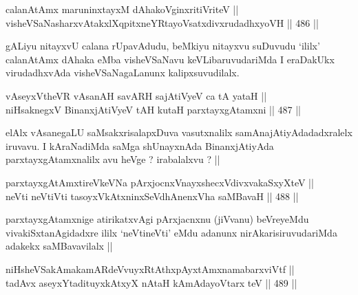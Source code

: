 
\begin{shl}
calanAtAmx maruninxtayxM dAhakoV\s ginxritiVriteV || \\
visheVSaNasharxvAtakxlXqpitxneYRtayoVsatxdivxrudadhxyoVH ||  486 ||  
\end{shl}

\begin{artha}
gALiyu nitayxvU calana rUpavAdudu, beMkiyu nitayxvu suDuvudu `ililx'
calanAtAmx dAhaka eMba visheVSaNavu keVLibaruvudariMda I eraDakUkx
virudadhxvAda visheVSaNagaLanunx kalipxsuvudilalx.
\end{artha}


\begin{shl}
vAseyxV\s theVR vAsanAH savARH sajAtiVyeV ca tA yataH || \\
niHsaknegxV BinanxjAtiVyeV tAH kutaH parxtayxgAtamxni ||  487 ||  
\end{shl}

\begin{artha}
elAlx vAsanegaLU saMsakxrisalapxDuva vasutxnalilx
samAnajAtiyAdadadxralelx iruvavu. I kAraNadiMda saMga shUnayxnAda
BinanxjAtiyAda parxtayxgAtamxnalilx avu heVge ? irabalalxvu ? ||
\end{artha}

\begin{shl}
parxtayxgAtAmxtireVkeVNa pArxjocnxV\s nayxshecxVdivxvakaSxyXteV || \\
neVti neVtiVti tasoyxVkAtxninxSeVdhAnenxVha saMBavaH ||  488 ||  
\end{shl}

\begin{artha}
parxtayxgAtamxnige atirikatxvAgi pArxjacnxnu (jiVvanu) beVreyeMdu
vivakiSxtanAgidadxre ililx `neVtineVti' eMdu adanunx
nirAkarisiruvudariMda adakekx saMBavavilalx ||
\end{artha}


\begin{shl}
niHsheVSakAmakamARdeVvuyxRtAthxpAyx\s \s tAmxnamabarxviVtf || \\
tadAvx aseyxYtadituyxkAtxyX nAtaH kAmAdayoV\s tarx teV ||  489 ||  
\end{shl}

